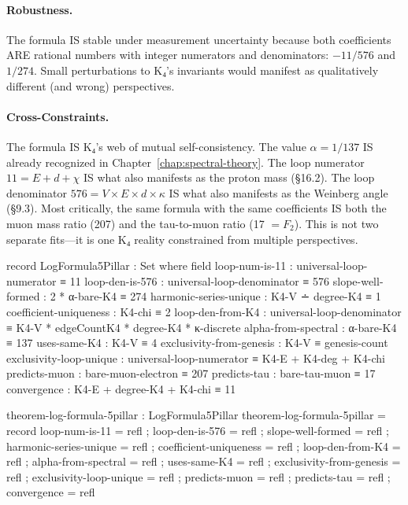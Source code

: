 \documentclass[11pt,a4paper]{book}
\begin{document}
\paragraph{Robustness.} The formula IS stable under measurement uncertainty because both coefficients ARE rational numbers with integer numerators and denominators: $-11/576$ and $1/274$. Small perturbations to K₄'s invariants would manifest as qualitatively different (and wrong) perspectives.

\paragraph{Cross-Constraints.} The formula IS K₄'s web of mutual self-consistency. The value $\alpha = 1/137$ IS already recognized in Chapter~\ref{chap:spectral-theory}. The loop numerator $11 = E + d + \chi$ IS what also manifests as the proton mass (\S 16.2). The loop denominator $576 = V \times E \times d \times \kappa$ IS what also manifests as the Weinberg angle (\S 9.3). Most critically, the same formula with the same coefficients IS both the muon mass ratio (207) and the tau-to-muon ratio (17 $= F_2$). This is not two separate fits—it is one K₄ reality constrained from multiple perspectives.

\begin{code}
record LogFormula5Pillar : Set where
  field
    loop-num-is-11         : universal-loop-numerator ≡ 11
    loop-den-is-576        : universal-loop-denominator ≡ 576
    slope-well-formed      : 2 * α-bare-K4 ≡ 274
    harmonic-series-unique : K4-V ∸ degree-K4 ≡ 1
    coefficient-uniqueness : K4-chi ≡ 2
    loop-den-from-K4       : universal-loop-denominator ≡ K4-V * edgeCountK4 * degree-K4 * κ-discrete
    alpha-from-spectral    : α-bare-K4 ≡ 137
    uses-same-K4           : K4-V ≡ 4
    exclusivity-from-genesis : K4-V ≡ genesis-count
    exclusivity-loop-unique  : universal-loop-numerator ≡ K4-E + K4-deg + K4-chi
    predicts-muon          : bare-muon-electron ≡ 207
    predicts-tau           : bare-tau-muon ≡ 17
    convergence            : K4-E + degree-K4 + K4-chi ≡ 11

theorem-log-formula-5pillar : LogFormula5Pillar
theorem-log-formula-5pillar = record
  { loop-num-is-11         = refl
  ; loop-den-is-576        = refl
  ; slope-well-formed      = refl
  ; harmonic-series-unique = refl
  ; coefficient-uniqueness = refl
  ; loop-den-from-K4       = refl
  ; alpha-from-spectral    = refl
  ; uses-same-K4           = refl
  ; exclusivity-from-genesis = refl
  ; exclusivity-loop-unique = refl
  ; predicts-muon          = refl
  ; predicts-tau           = refl
  ; convergence            = refl
  }
\end{code}
\end{document}
